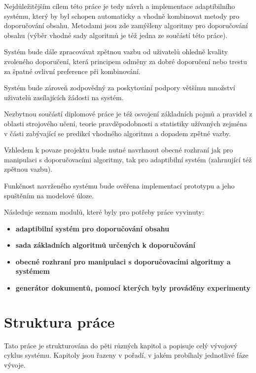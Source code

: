 \documentclass[thesis=M,czech]{FITthesis}[2014/05/07]
\begin{document}
\begin{introduction}
	Nejdůležitějším cílem této práce je tedy návrh a implementace adaptibilního systému, který by byl schopen automaticky a vhodně kombinovat metody pro doporučování obsahu. Metodami jsou zde zamýšleny algoritmy pro doporučování obsahu (výběr vhodné sady algoritmů je též jedna ze součástí této práce).
	
	Systém bude dále zpracovávat zpětnou vazbu od uživatelů ohledně kvality zvoleného doporučení, která principem odměny za dobré doporučení nebo trestu za špatné ovlivní preference při kombinování.
	
	Systém bude zároveň zodpovědný za poskytování podpory většímu množství uživatelů zasílajících žádosti na systém.
	
	Nezbytnou součástí diplomové práce je též osvojení základních pojmů a pravidel z oblasti strojového učení, teorie pravděpodobnosti a statistiky užívaných zejména v části zabývající se predikcí vhodného algoritmu a dopadem zpětné vazby. 
	
	Vzhledem k povaze projektu bude nutné navrhnout obecné rozhraní jak pro manipulaci s doporučovacími algoritmy, tak pro adaptibilní systém (zahrnující též zpětnou vazbu).
	
	Funkčnost navrženého systému bude ověřena implementací prototypu a jeho spuštěním na modelové úloze.
	
Následuje seznam modulů, které byly pro potřeby práce vyvinuty:

\begin{itemize}
  \item \textbf{adaptibilní systém pro doporučování obsahu}
  \item \textbf{sada základních algoritmů určených k doporučování}
  \item \textbf{obecné rozhraní pro manipulaci s doporučovacími algoritmy a systémem}
  \item \textbf{generátor dokumentů, pomocí kterých byly prováděny experimenty}
\end{itemize}	

\section{Struktura práce}
\label{sec:structure}
	Tato práce je strukturována do pěti různých kapitol a popisuje celý vývojový cyklus systému. Kapitoly jsou řazeny v pořadí, v jakém probíhaly jednotlivé fáze vývoje.	


\end{introduction}
\end{document}
